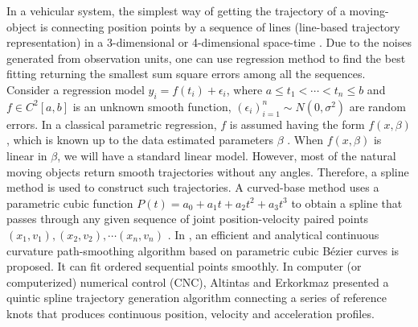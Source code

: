 In a vehicular system, the simplest way of getting the trajectory of a moving-object is connecting position points by a sequence of lines (line-based trajectory representation) in a 3-dimensional or 4-dimensional space-time \cite{agarwal2003indexing}. Due to the noises generated from observation units, one can use regression method to find the best fitting returning the smallest sum square errors among all the sequences. Consider a regression model $y_i=f(t_i)+\epsilon_i$, where $a \leq t_1 < \cdots < t_n \leq b$ and $f \in \mathit{C}^2[a,b]$ is an unknown smooth function, $(\epsilon_i)_{i=1}^n \sim N(0,\sigma^2)$ are random errors. In a classical parametric regression, $f$ is assumed having the form $f(x,\beta)$, which is known up to the data estimated parameters $\beta$ \cite{kim2004smoothing}. When $f(x,\beta)$ is linear in $\beta$, we will have a standard linear model. However, most of the natural moving objects return smooth trajectories without any angles. Therefore, a spline method is used to construct such trajectories. A curved-base method uses a parametric cubic function $P(t)=a_0+a_1t+a_2t^2+a_3t^3$ to obtain a spline that passes through any given sequence of joint position-velocity paired points $(x_1, v_1), (x_2, v_2), \cdots (x_n,v_n)$ \cite{yu2004curve}.  In \cite{yang2010analytical}, an efficient and analytical continuous curvature path-smoothing algorithm based on parametric cubic B\'{e}zier curves is proposed. It can fit ordered sequential points smoothly. In computer (or computerized) numerical control (CNC), Altintas and Erkorkmaz \cite{erkorkmaz2001high} presented a quintic spline trajectory generation algorithm connecting a series of reference knots that produces continuous position, velocity and acceleration profiles.

